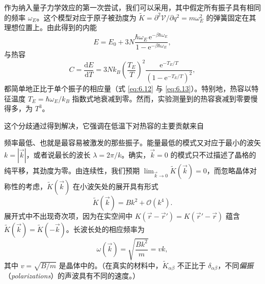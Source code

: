 作为纳入量子力学效应的第一次尝试，我们可以采用，其中假定所有振子具有相同的频率 $\omega_E$。这个模型对应于原子被劲度为 $\tilde K=\partial^2\mathcal V/\partial q^2=m\omega_E^2$ 的弹簧固定在其理想位置上。由此得到的内能
\begin{equation}\label{eq:6.38}
E=E_0+3N\frac{\hbar\omega_E\,\mathrm e^{-\beta\hbar\omega_E}}{1-\mathrm e^{-\beta\hbar\omega_E}},
\end{equation}
与热容
\begin{equation}\label{eq:6.39}
C=\frac{\mathrm dE}{\mathrm dT}=3Nk_B\left(\frac{T_E}{T}\right)^2\frac{\mathrm e^{-T_E/T}}{\left(1-\mathrm e^{-T_E/T}\right)^2},
\end{equation}
都简单地正比于单个振子的相应量（式 \eqref{eq:6.12} 与 \eqref{eq:6.13}）。特别地，热容以特征温度 $T_E=\hbar\omega_E/k_B$ 指数式地衰减到零。然而，实验测量到的热容衰减到零要慢得多，为 $T^3$。

这个分歧通过得到解决，它强调在低温下对热容的主要贡献来自



频率最低、也就是最容易被激发的那些振子。能量最低的模式又对应于最小的波矢 $k=|\vec k|$，或者说最长的波长 $\lambda=2\pi/k$。确实，$\vec k=0$ 的模式只不过描述了晶格的纯平移，其劲度为零。由连续性，我们预期 $\lim_{\vec k\to0}\tilde K(\vec k)=0$，而忽略晶体对称性的考虑，$\tilde K(\vec k)$ 在小波矢处的展开具有形式
\begin{equation*}
\tilde K(\vec k)=Bk^2+\mathcal O(k^4).
\end{equation*}
展开式中不出现奇次项，因为在实空间中 $K(\vec r-\vec r')=K(\vec r'-\vec r)$ 蕴含 $\tilde K(\vec k)=\tilde K(-\vec k)$。长波长处的相应频率为
\begin{equation}\label{eq:6.40}
\omega(\vec k)=\sqrt{\frac{Bk^2}{m}}=vk,
\end{equation}
其中 $v=\sqrt{B/m}$ 是晶体中的。（在真实的材料中，$\tilde K_{\alpha\beta}$ 不正比于 $\delta_{\alpha\beta}$，不同\emph{偏振}（\textit{polarizations}）的声波具有不同的速度。）



